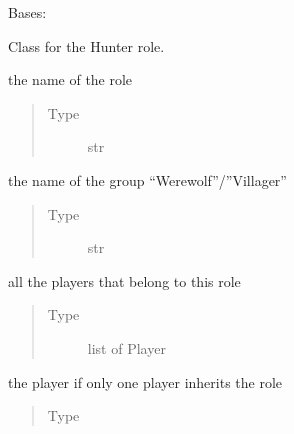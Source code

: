 \documentclass[letterpaper,10pt,english]{sphinxmanual}
\begin{document}
\begin{fulllineitems}
Bases: 

Class for the Hunter role.


\begin{fulllineitems}
the name of the role
\begin{quote}\begin{description}
\item[{Type}] \leavevmode
str

\end{description}\end{quote}

\end{fulllineitems}



\begin{fulllineitems}
the name of the group “Werewolf”/”Villager”
\begin{quote}\begin{description}
\item[{Type}] \leavevmode
str

\end{description}\end{quote}

\end{fulllineitems}



\begin{fulllineitems}
all the players that belong to this role
\begin{quote}\begin{description}
\item[{Type}] \leavevmode
list of Player

\end{description}\end{quote}

\end{fulllineitems}



\begin{fulllineitems}
the player if only one player inherits the role
\begin{quote}\begin{description}
\item[{Type}] \leavevmode
{\hyperref[\detokenize{chatwolf:chatwolf.player.Player}]{}}


\end{description}
\end{quote}
\end{fulllineitems}
\end{fulllineitems}
\end{document}
